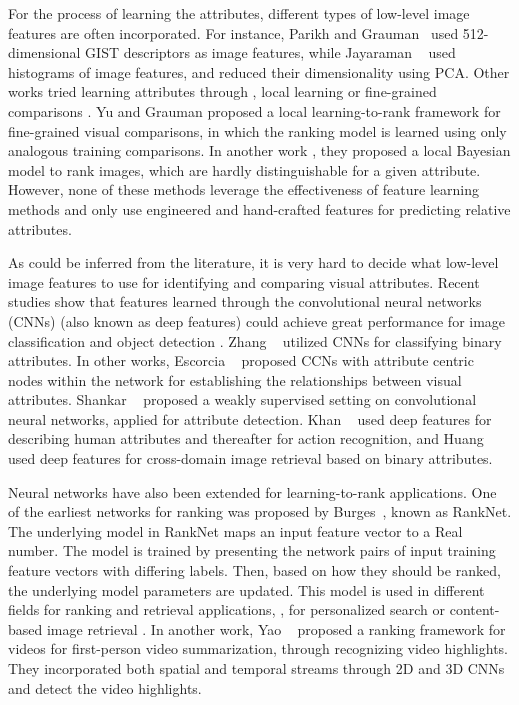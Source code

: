 For the process of learning the attributes, different types of low-level image features are often  incorporated. For instance, Parikh and Grauman~\cite{parikh2011} used 512-dimensional GIST \cite{Aude01} descriptors as image features, while Jayaraman \etal~\cite{6909607} used histograms of image features, and reduced their dimensionality using PCA. Other works tried learning attributes through \eg, local learning \cite{1641014} or fine-grained comparisons \cite{Yu2014}. Yu and Grauman \cite{Yu2014} proposed a local learning-to-rank framework for fine-grained visual comparisons, in which the ranking model is learned using only analogous training comparisons. In another work \cite{Yu2015}, they proposed a local Bayesian model to rank images, which are hardly distinguishable for a given attribute. However, none of these methods leverage the effectiveness of feature learning methods and only use engineered and hand-crafted features for predicting relative attributes. %

As could be inferred from the literature, it is very hard to decide what low-level image features to use for identifying and comparing visual attributes. Recent studies show that features learned through the convolutional neural networks (CNNs) \cite{LeCun1989HandwrittenDR} (also known as deep features) could achieve great performance for image classification \cite{Krizhevsky2012ImageNetCW} and object detection \cite{6909475}. Zhang \etal~\cite{6909608} utilized CNNs for classifying binary attributes. In other works, Escorcia \etal~\cite{Escorcia_2015_CVPR} proposed CCNs with attribute centric nodes within the network for establishing the relationships between visual attributes. Shankar \etal~\cite{Shankar_2015_CVPR} proposed a weakly supervised setting on convolutional neural networks, applied for attribute detection. Khan \etal~\cite{khan15} used deep features for describing human attributes and thereafter for action recognition, and Huang \etal~\cite{Huang_2015_ICCV} used deep features for cross-domain image retrieval based on binary attributes.  

Neural networks have also been extended for learning-to-rank applications. One of the earliest networks for ranking was proposed by Burges\etal~\cite{Burges2005}, known as RankNet. The underlying model in RankNet maps an input feature vector to a Real number. The model is trained  by presenting the network pairs of input training feature vectors with differing labels. Then, based on how they should be ranked, the underlying model parameters are updated. This model is used in different fields for ranking and retrieval applications, \eg, for personalized search \cite{song2014} or content-based image retrieval \cite{Wan2014}. In another work, Yao \etal~\cite{YaoCVPR2016} proposed a ranking framework for videos for first-person
video summarization, through recognizing video highlights. They incorporated both spatial and temporal streams through 2D and 3D CNNs and detect the video highlights.

